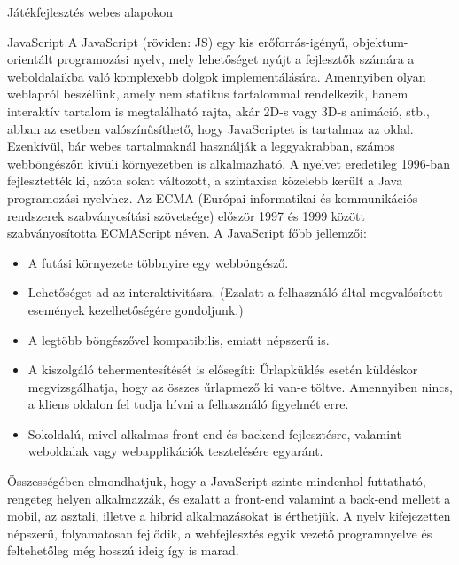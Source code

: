 \begin{MyChapter}{Játékfejlesztés webes alapokon}
	\begin{MySection}{JavaScript}
		A JavaScript (röviden: JS) egy kis erőforrás-igényű, objektum-orientált programozási nyelv, mely lehetőséget nyújt a fejlesztők számára a weboldalaikba való komplexebb dolgok implementálására. Amennyiben olyan weblapról beszélünk, amely nem statikus tartalommal rendelkezik, hanem interaktív tartalom is megtalálható rajta, akár 2D-s vagy 3D-s animáció, stb., abban az esetben valószínűsíthető, hogy JavaScriptet is tartalmaz az oldal. Ezenkívül, bár webes tartalmaknál használják a leggyakrabban, számos webböngészőn kívüli környezetben is alkalmazható. A nyelvet eredetileg 1996-ban fejlesztették ki, azóta sokat változott, a szintaxisa közelebb került a Java programozási nyelvhez. Az ECMA (Európai informatikai és kommunikációs rendszerek szabványosítási szövetsége) először 1997 és 1999 között szabványosította ECMAScript néven.
		A JavaScript főbb jellemzői:
		\begin{itemize}
			\item A futási környezete többnyire egy webböngésző.
			\item Lehetőséget ad az interaktivitásra. (Ezalatt a felhasználó által megvalósított események kezelhetőségére gondoljunk.)
			\item A legtöbb böngészővel kompatibilis, emiatt népszerű is.
			\item A kiszolgáló tehermentesítését is elősegíti: Űrlapküldés esetén küldéskor megvizsgálhatja, hogy az összes űrlapmező ki van-e töltve. Amennyiben nincs, a kliens oldalon fel tudja hívni a felhasználó figyelmét erre.
			\item Sokoldalú, mivel alkalmas front-end és backend fejlesztésre, valamint weboldalak vagy webapplikációk tesztelésére egyaránt.
		\end{itemize}
		Összességében elmondhatjuk, hogy a JavaScript szinte mindenhol futtatható, rengeteg helyen alkalmazzák, és ezalatt a front-end valamint a back-end mellett a mobil, az asztali, illetve a hibrid alkalmazásokat is érthetjük. A nyelv kifejezetten népszerű, folyamatosan fejlődik, a webfejlesztés egyik vezető programnyelve és feltehetőleg még hosszú ideig így is marad.
	\end{MySection}


\end{MyChapter}
